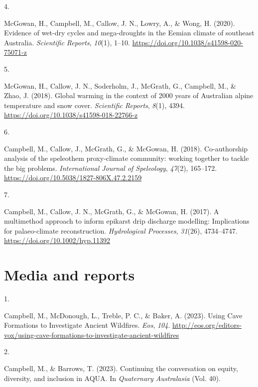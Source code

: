 \documentclass[11pt,a4paper,]{moderncv}
\newlength{\csllabelwidth}
\newcommand{\CSLLeftMargin}[1]{\parbox[t]{\csllabelwidth}{#1}}
\newcommand{\CSLRightInline}[1]{\parbox[t]{\linewidth - \csllabelwidth}{#1}}
\begin{document}
\leavevmode{}%
\CSLLeftMargin{4. }%
\CSLRightInline{McGowan, H., Campbell, M., Callow, J. N., Lowry, A., \&
Wong, H. (2020). Evidence of wet-dry cycles and mega-droughts in the
Eemian climate of southeast Australia. \emph{Scientific Reports},
\emph{10}(1), 1--10. \url{https://doi.org/10.1038/s41598-020-75071-z}}

\leavevmode{}%
\CSLLeftMargin{5. }%
\CSLRightInline{McGowan, H., Callow, J. N., Soderholm, J., McGrath, G.,
Campbell, M., \& Zhao, J. (2018). Global warming in the context of 2000
years of Australian alpine temperature and snow cover. \emph{Scientific
Reports}, \emph{8}(1), 4394.
\url{https://doi.org/10.1038/s41598-018-22766-z}}

\leavevmode{}%
\CSLLeftMargin{6. }%
\CSLRightInline{Campbell, M., Callow, J., McGrath, G., \& McGowan, H.
(2018). Co-authorship analysis of the speleothem proxy-climate
community: working together to tackle the big problems.
\emph{International Journal of Speleology}, \emph{47}(2), 165--172.
\url{https://doi.org/10.5038/1827-806X.47.2.2159}}

\leavevmode{}%
\CSLLeftMargin{7. }%
\CSLRightInline{Campbell, M., Callow, J. N., McGrath, G., \& McGowan, H.
(2017). A multimethod approach to inform epikarst drip discharge
modelling: Implications for palaeo-climate reconstruction.
\emph{Hydrological Processes}, \emph{31}(26), 4734--4747.
\url{https://doi.org/10.1002/hyp.11392}}

\newpage

\hypertarget{media-and-reports}{%
\section{Media and reports}\label{media-and-reports}}

\hypertarget{bibliography}{}
\leavevmode{}%
\CSLLeftMargin{1. }%
\CSLRightInline{Campbell, M., McDonough, L., Treble, P. C., \& Baker, A.
(2023). Using Cave Formations to Investigate Ancient Wildfires.
\emph{Eos}, \emph{104}.
\url{http://eos.org/editors-vox/using-cave-formations-to-investigate-ancient-wildfires}}

\leavevmode{}%
\CSLLeftMargin{2. }%
\CSLRightInline{Campbell, M., \& Barrows, T. (2023). Continuing the
conversation on equity, diversity, and inclusion in AQUA. In
\emph{Quaternary Australasia} (Vol. 40).}
\end{document}
